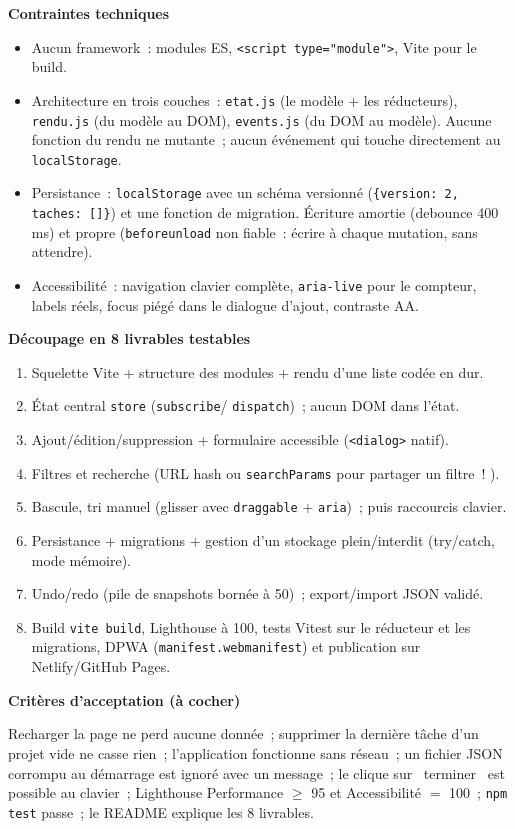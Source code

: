 \documentclass[12pt,a4paper,twoside,openright]{book}
\newcommand{\etape}[1]{\par\medskip\noindent\textbf{\large #1}\par\smallskip}
\begin{document}
\etape{Contraintes techniques}
\begin{itemize}
  \item Aucun framework~: modules ES, \verb|<script type="module">|, Vite pour le build.
  \item Architecture en trois couches~: \verb|etat.js| (le mod\`ele + les r\'educteurs),
        \verb|rendu.js| (du mod\`ele au DOM), \verb|events.js| (du DOM au mod\`ele). Aucune fonction
        du rendu ne mutante~; aucun \'ev\'enement qui touche directement au \verb|localStorage|.
  \item Persistance~: \verb|localStorage| avec un sch\'ema versionn\'e (\verb|{version: 2, taches: []}|)
        et une fonction de migration. \'Ecriture amortie (debounce 400 ms) et propre
        (\verb|beforeunload| non fiable~: \'ecrire \`a chaque mutation, sans attendre).
  \item Accessibilit\'e~: navigation clavier compl\`ete, \verb|aria-live| pour le compteur, labels
        r\'eels, focus pi\'eg\'e dans le dialogue d'ajout, contraste AA.
\end{itemize}

\etape{D\'ecoupage en 8 livrables testables}
\begin{enumerate}
  \item Squelette Vite + structure des modules + rendu d'une liste cod\'ee en dur.
  \item \'Etat central \verb|store| (\verb|subscribe|/ \verb|dispatch|)~; aucun DOM dans l'\'etat.
  \item Ajout/\'edition/suppression + formulaire accessible (\verb|<dialog>| natif).
  \item Filtres et recherche (URL hash ou \verb|searchParams| pour partager un filtre~! ).
  \item Bascule, tri manuel (glisser avec \verb|draggable| + \verb|aria|)~; puis raccourcis clavier.
  \item Persistance + migrations + gestion d'un stockage plein/interdit (try/catch, mode m\'emoire).
  \item Undo/redo (pile de snapshots born\'ee \`a 50)~; export/import JSON valid\'e.
  \item Build \verb|vite build|, Lighthouse \`a 100, tests Vitest sur le r\'educteur et les migrations,
        DPWA (\verb|manifest.webmanifest|) et publication sur Netlify/GitHub Pages.
\end{enumerate}

\etape{Crit\`eres d'acceptation (\`a cocher)}
Recharger la page ne perd aucune donn\'ee~; supprimer la derni\`ere t\^ache d'un projet vide ne casse
rien~; l'application fonctionne sans r\'eseau~; un fichier JSON corrompu au d\'emarrage est ignor\'e
avec un message~; le clique sur \og ~terminer~ \fg{} est possible au clavier~; Lighthouse Performance
$\geq$ 95 et Accessibilit\'e $=$ 100~; \verb|npm test| passe~; le README explique les 8 livrables.
\end{document}
